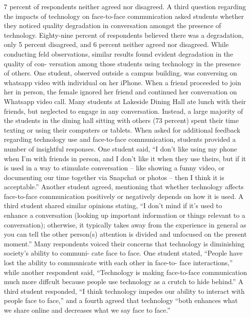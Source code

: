 \documentclass[11pt]{article} %
\begin{document}
7 percent of respondents neither agreed nor disagreed. 
A third question regarding the impacts of technology on face-to-face communication asked students 
whether they noticed quality degradation in conversation amongst the presence of technology. Eighty-nine 
percent of respondents believed there was a degradation, only 5 percent disagreed, and 6 percent neither agreed nor 
disagreed. 
While conducting feld observations, similar results found evident degradation in the quality of con-
versation among those students using technology in the presence of others. One student, observed outside a 
campus building, was conversing on whatsapp video with individual on her iPhone. When a friend proceeded to join her in person,
the female ignored her friend and continued her conversation on Whatsapp video call. Many students at Lakeside 
Dining Hall ate lunch with their friends, but neglected to engage in any conversation. Instead, a large majority 
of the students in the dining hall sitting with others (73 percent) spent their time texting or using their computers or 
tablets. 
When asked for additional feedback regarding technology use and face-to-face communication, 
students provided a number of insightful responses. One student said, “I don’t like using my phone when I’m 
with friends in person, and I don’t like it when they use theirs, but if it is used in a way to stimulate conversation –
like showing a funny video, or documenting our time together via Snapchat or photos – then I think it is 
acceptable.” Another student agreed, mentioning that whether technology affects face-to-face communication 
positively or negatively depends on how it is used. A third student shared similar opinions stating, “I don’t mind 
if it’s used to enhance a conversation (looking up important information or things relevant to a conversation); 
otherwise, it typically takes away from the experience in general as you can tell the other person(s) attention 
is divided and unfocused on the present moment.” 
Many respondents voiced their concerns that technology is diminishing society’s ability to communi-
cate face to face. One student stated, “People have lost the ability to communicate with each other in face-to-
face interactions,” while another respondent said, “Technology is making face-to-face communication much 
more diffcult because people use technology as a crutch to hide behind.” A third student responded, “I think 
technology impedes our ability to interact with people face to face,” and a fourth agreed that technology “both 
enhances what we share online and decreases what we say face to face.”
\end{document}
